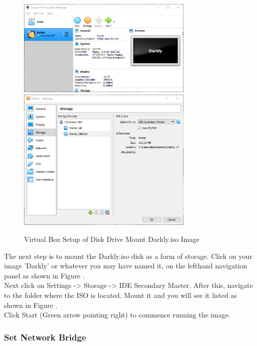 \begin{figure}[!htb]
    \centering
    \includegraphics[width=0.752\textwidth]{images/Win00-07.png}\\[0cm]  
    \includegraphics[width=0.752\textwidth]{images/Win00-08.png}\\[0cm]  
    \caption[Windows Virtual Box]{Virtual Box Setup of Disk Drive Mount Darkly.iso Image}
    \label{fig:00-07 - Windows Virtual Box ISO Mount} 
\end{figure}
The next step is to mount the Darkly.iso disk as a form of storage. Click on
your image 'Darkly' or whatever you may have named it, on the lefthand navigation
panel as shown in Figure .\\

Next click on Settings -> Storage -> IDE Secondary Master. After this, navigate
to the folder where the ISO is located. Mount it and you will see it listed
as shown in Figure .\\

Click Start (Green arrow pointing right) to commence running the image.

\subsubsection{Set Network Bridge}

